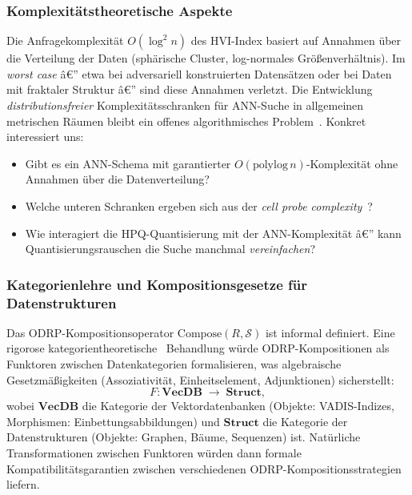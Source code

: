﻿\documentclass[12pt,a4paper]{article}
\begin{document}
\subsubsection{Komplexitätstheoretische Aspekte}

Die Anfragekomplexität $O(\log^2 n)$ des HVI-Index
basiert auf Annahmen über die Vertei\-lung der Daten
(sphärische Cluster, log-normales Größenverhältnis).
Im \emph{worst case} â€” etwa bei adversariell konstruierten
Datensätzen oder bei Daten mit fraktaler Struktur â€”
sind diese Annahmen verletzt. Die Entwicklung
\emph{distributionsfreier} Komplexitätsschranken für
ANN-Suche in allgemeinen metrischen Räumen bleibt
ein offenes algorithmisches Problem~\cite{indyk2017approximate}.
Konkret interessiert uns:
\begin{itemize}[leftmargin=1.2em, itemsep=2pt]
  \item Gibt es ein ANN-Schema mit garantierter
        $O(\text{polylog}\,n)$-Komplexität ohne
        Annahmen über die Datenverteilung?
  \item Welche unteren Schranken ergeben sich aus der
        \emph{cell probe complexity}~\cite{miltersen1999data}?
  \item Wie interagiert die HPQ-Quantisierung mit der
        ANN-Komplexität â€” kann Quantisierungsrauschen
        die Suche manchmal \emph{vereinfachen}?
\end{itemize}

\subsubsection{Kategorienlehre und Kompositionsgesetze
              für Datenstrukturen}

Das ODRP-Kompositionsoperator
$\text{Compose}(R, \mathcal{S})$ ist informal definiert.
Eine rigorose kategorientheoretische~\cite{mac1978categories}
Behandlung würde ODRP-Kompositionen als Funktoren zwischen
Datenkategorien formalisieren, was algebraische Gesetzmäßigkeiten
(Assoziativität, Einheitselement, Adjunktionen) sicherstellt:
\begin{equation}
  F: \mathbf{VecDB} \;\longrightarrow\; \mathbf{Struct},
\end{equation}
wobei $\mathbf{VecDB}$ die Kategorie der Vektordatenbanken
(Objekte: VADIS-Indizes, Morphismen: Einbettungsabbildungen)
und $\mathbf{Struct}$ die Kategorie der Datenstrukturen
(Objekte: Graphen, Bäume, Sequenzen) ist.
Natürliche Transformationen zwischen Funktoren würden
dann formale Kompatibilitätsgarantien zwischen
verschiedenen ODRP-Kompositions\-strategien liefern.
\end{document}
